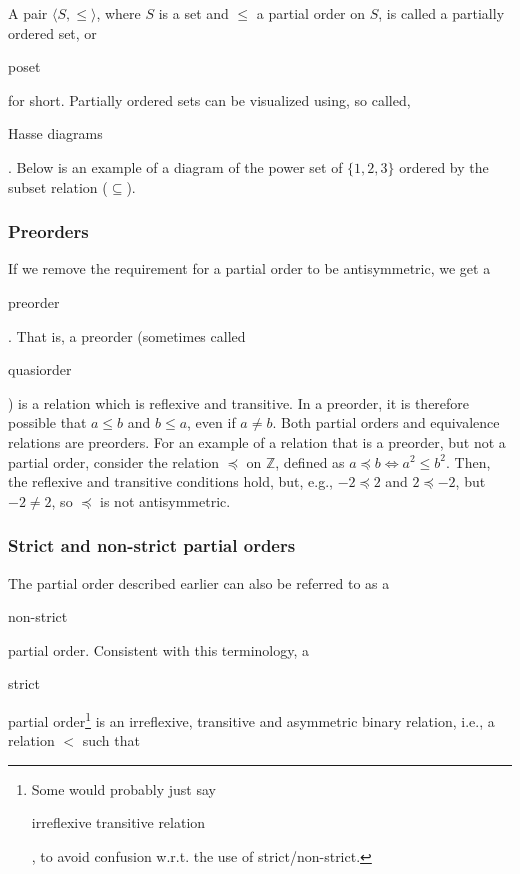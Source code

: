 \documentclass[11pt]{article}
\theoremstyle{plain}
\theoremstyle{definition}
\begin{document}
\noindent A pair $ \langle S, \le \rangle $, where $ S $ is a set and $ \le $ a partial order on $ S $, is called a partially ordered set, or \begin{em}poset\end{em} for short.
Partially ordered sets can be visualized using, so called, \begin{em}Hasse diagrams\end{em}. Below is an example of a diagram of the power set of $ \{ 1, 2, 3 \} $ ordered by the subset relation ($ \subseteq $). 

\begin{center}
  \def\svgwidth{0.3\columnwidth}
  
\end{center}


\subsubsection*{Preorders}

\noindent If we remove the requirement for a partial order to be antisymmetric, we get a \begin{em}preorder\end{em}. That is, a preorder (sometimes called \begin{em}quasiorder\end{em}) is a relation which is reflexive and transitive.
In a preorder, it is therefore possible that $ a \le b $ and $ b \le a $, even if $ a \ne b $.
Both partial orders and equivalence relations are preorders.
For an example of a relation that is a preorder, but not a partial order, consider the relation $ \preceq $ on $ \mathbb{Z} $, defined as $ a \preceq b \iff a^2 \le b^2 $.
Then, the reflexive and transitive conditions hold, but, e.g., $ -2 \preceq 2 $ and $ 2 \preceq -2 $, but $ -2 \ne 2 $, so $ \preceq $ is not antisymmetric. \\

\begin{center}
  \def\svgwidth{0.5\columnwidth}
  
\end{center}

\subsubsection*{Strict and non-strict partial orders}

The partial order described earlier can also be referred to as a \begin{em}non-strict\end{em} partial order. Consistent with this terminology, a \begin{em}strict\end{em} partial order\footnote[1]{Some would probably just say \begin{em}irreflexive transitive relation\end{em}, to avoid confusion w.r.t. the use of strict/non-strict.} is an irreflexive, transitive and asymmetric binary relation, i.e., a relation $ < $ such that
\end{document}
